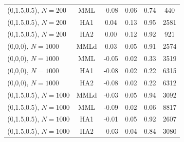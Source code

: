 \documentclass[12pt,fleqn]{article}
\begin{document}
\begin{table}[ht]
\begin{tabular}{lccccc}
  (0,1.5,0.5), $N=200$ & MML & -0.08 & 0.06 & 0.74 & 440 \\
  (0,1.5,0.5), $N=200$ & HA1 & 0.04 & 0.13 & 0.95 & 2581 \\
  (0,1.5,0.5), $N=200$ & HA2 & 0.00 & 0.12 & 0.92 & 921 \\
  (0,0,0), $N=1000$ & MMLd & 0.03 & 0.05 & 0.91 & 2574 \\
  (0,0,0), $N=1000$ & MML & -0.05 & 0.02 & 0.33 & 3519 \\
  (0,0,0), $N=1000$ & HA1 & -0.08 & 0.02 & 0.22 & 6315 \\
  (0,0,0), $N=1000$ & HA2 & -0.08 & 0.02 & 0.22 & 6312 \\
  (0,1.5,0.5), $N=1000$ & MMLd & -0.03 & 0.05 & 0.94 & 3092 \\
  (0,1.5,0.5), $N=1000$ & MML & -0.09 & 0.02 & 0.06 & 8817  \\
  (0,1.5,0.5), $N=1000$ & HA1 & -0.01 & 0.05 & 0.92 & 2607 \\
  (0,1.5,0.5), $N=1000$ & HA2 & -0.03 & 0.04 & 0.84 & 3080 \\
\hline
\end{tabular}
\end{table}

\end{document}
